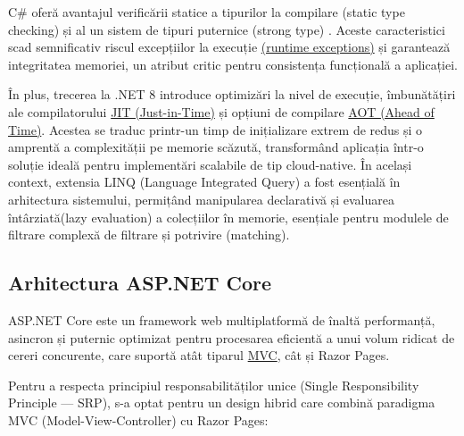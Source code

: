 C\# oferă avantajul verificării statice a tipurilor la compilare (static type checking) și al un sistem de tipuri puternice (strong type) \href{https://learn.microsoft.com/en-us/dotnet/csharp/fundamentals/types/}{}\cite{cSharpType_ref}. Aceste caracteristici scad semnificativ riscul excepțiilor la execuție \href{https://www.microsoft.com/en-us/research/wp-content/uploads/2016/02/specsharp-krml135.pdf}{(runtime exceptions)}\cite{cSharpExeption_ref} și garantează integritatea memoriei, un atribut critic pentru consistența funcțională a aplicației.

În plus, trecerea la .NET 8 introduce optimizări la nivel de execuție, îmbunătățiri ale compilatorului \href{https://learn.microsoft.com/en-us/dotnet/standard/managed-execution-process}{JIT (Just-in-Time)}\cite{JIT_ref} și opțiuni de compilare \href{https://learn.microsoft.com/en-us/dotnet/core/deploying/native-aot/?tabs=windows%2Cnet8}{AOT (Ahead of Time)}\cite{AOT_ref}. Acestea se traduc printr-un timp de inițializare extrem de redus și o amprentă a complexității pe memorie scăzută, transformând aplicația într-o soluție ideală pentru implementări scalabile de tip cloud-native. În același context, extensia LINQ (Language Integrated Query) a fost esențială în arhitectura sistemului, permițând manipularea declarativă și evaluarea întârziată(lazy evaluation) a colecțiilor în memorie, esențiale pentru modulele de filtrare complexă de filtrare și potrivire (matching)\href{https://learn.microsoft.com/en-us/dotnet/csharp/linq/}{}\cite{linq_ref}.

\subsection{Arhitectura ASP.NET Core}

ASP.NET Core este un framework web multiplatformă de înaltă performanță, asincron și puternic optimizat pentru procesarea eficientă a unui volum ridicat de cereri concurente, care suportă atât tiparul \href{https://learn.microsoft.com/en-us/aspnet/core/mvc/overview?view=aspnetcore-10.0}{MVC}\cite{MVC_ref}, cât și Razor Pages.

Pentru a respecta principiul responsabilităților unice (Single Responsibility Principle — SRP), s-a optat pentru un design hibrid care combină paradigma MVC (Model-View-Controller) cu Razor Pages:

